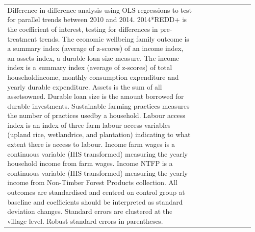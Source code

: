 \documentclass[
]{article}
\begin{document}
\begin{landscape}
\begin{table}[h]
\begin{center}
\begin{tabular}{l c c c c c c c c}
{{{                      Difference-in-difference analysis using OLS regressions to test for parallel trends between 2010 and 2014. 2014*REDD+ is the coefficient of interest, testing for differences in pre-treatment trends. The economic wellbeing family outcome is a summary index (average of z-scores) of an income index, an assets index, a durable loan size measure. The income index is a summary index (average of z-scores) of total householdincome, monthly consumption expenditure and yearly durable expenditure. Assets is the sum of all assetsowned. Durable loan size is the amount borrowed for durable investments. Sustainable farming practices measures the number of practices usedby a household. Labour access index is an index of three farm labour access variables (upland rice, wetlandrice, and plantation) indicating to what extent there is access to labour. Income farm wages is a continuous variable (IHS transformed) measuring the yearly household income from farm wages. Income NTFP is a continuous variable (IHS transformed) measuring the yearly income from Non-Timber Forest Products collection. All outcomes are standardised and centred on control group at baseline and coefficients should be interpreted as standard deviation changes. Standard errors are clustered at the village level. Robust standard errors in parentheses.}}}
\end{tabular}
\label{table:coefficients}
\end{center}
\end{table}
\end{landscape}
\end{document}
